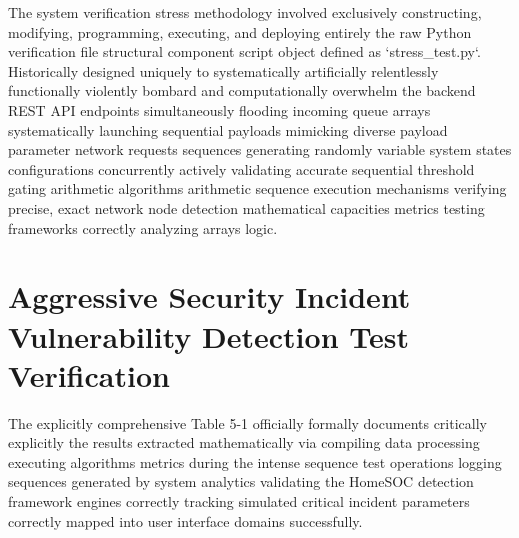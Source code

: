 The system verification stress methodology involved exclusively constructing, modifying, programming, executing, and deploying entirely the raw Python verification file structural component script object defined as `stress\_test.py`. 
Historically designed uniquely to systematically artificially relentlessly functionally violently bombard and computationally overwhelm the backend REST API endpoints simultaneously flooding incoming queue arrays systematically launching sequential payloads mimicking diverse payload parameter network requests sequences generating randomly variable system states configurations concurrently actively validating accurate sequential threshold gating arithmetic algorithms arithmetic sequence execution mechanisms verifying precise, exact network node detection mathematical capacities metrics testing frameworks correctly analyzing arrays logic.

\section{Aggressive Security Incident Vulnerability Detection Test Verification}
The explicitly comprehensive Table 5-1 officially formally documents critically explicitly the results extracted mathematically via compiling data processing executing algorithms metrics during the intense sequence test operations logging sequences generated by system analytics validating the HomeSOC detection framework engines correctly tracking simulated critical incident parameters correctly mapped into user interface domains successfully.

